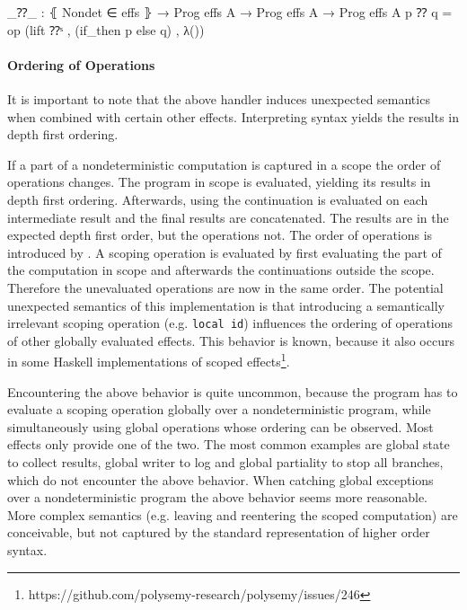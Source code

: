 \begin{code}
_⁇_ : ⦃ Nondet ∈ effs ⦄ → Prog effs A → Prog effs A → Prog effs A
p ⁇ q = op (lift ⁇ˢ , (if_then p else q) , λ())
\end{code}

\paragraph{Ordering of Operations}
It is important to note that the above handler induces unexpected semantics when
combined with certain other effects.
Interpreting  syntax yields the results in depth first
ordering.

If a part of a nondeterministic computation is captured in a scope the order of
operations changes.
The program in scope is evaluated, yielding its results in depth first ordering.
Afterwards, using  the continuation is evaluated on each
intermediate result and the final results are concatenated.
The results are in the expected depth first order, but the operations not.
The order of operations is introduced by \AgdaFunction{>>=}.
A scoping operation is evaluated by first evaluating the part of the computation
in scope and afterwards the continuations outside the scope.
Therefore the unevaluated operations are now in the same order.
The potential unexpected semantics of this implementation is that introducing a
semantically irrelevant scoping operation (e.g. \texttt{local id}) influences
the ordering of operations of other globally evaluated effects.
This behavior is known, because it also occurs in some Haskell implementations
of scoped
effects\footnote{https://github.com/polysemy-research/polysemy/issues/246}.

Encountering the above behavior is quite uncommon, because the program has to
evaluate a scoping operation globally over a nondeterministic program, while
simultaneously using global operations whose ordering can be observed.
Most effects only provide one of the two.
The most common examples are global state to collect results, global writer to
log and global partiality to stop all branches, which do not encounter the above
behavior.
When catching global exceptions over a nondeterministic program the above
behavior seems more reasonable.
More complex semantics (e.g. leaving and reentering the scoped computation) are
conceivable, but not captured by the standard representation of higher order
syntax.


